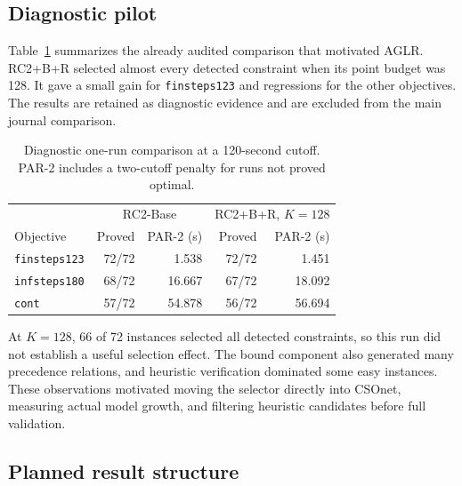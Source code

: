 \documentclass[preprint,12pt,authoryear]{elsarticle}
\begin{document}
\subsection{Diagnostic pilot}
\label{sec:pilot}

Table~\ref{tab:pilot-comparison} summarizes the already audited comparison that
motivated AGLR. RC2+B+R selected almost every detected constraint when its point
budget was 128. It gave a small gain for \texttt{finsteps123} and regressions for
the other objectives. The results are retained as diagnostic evidence and are
excluded from the main journal comparison.

\begin{table}[htbp]
\centering
\caption{Diagnostic one-run comparison at a 120-second cutoff. PAR-2 includes a
two-cutoff penalty for runs not proved optimal.}
\label{tab:pilot-comparison}
\begin{tabular}{lrrrr}
\toprule
& \multicolumn{2}{c}{RC2-Base} & \multicolumn{2}{c}{RC2+B+R, $K=128$} \\
Objective & Proved & PAR-2 (s) & Proved & PAR-2 (s) \\
\midrule
\texttt{finsteps123} & 72/72 & 1.538 & 72/72 & 1.451 \\
\texttt{infsteps180} & 68/72 & 16.667 & 67/72 & 18.092 \\
\texttt{cont}        & 57/72 & 54.878 & 56/72 & 56.694 \\
\bottomrule
\end{tabular}
\end{table}

At $K=128$, 66 of 72 instances selected all detected constraints, so this run
did not establish a useful selection effect. The bound component also generated
many precedence relations, and heuristic verification dominated some easy
instances. These observations motivated moving the selector directly into
CSOnet, measuring actual model growth, and filtering heuristic candidates before
full validation.

\subsection{Planned result structure}
\end{document}

